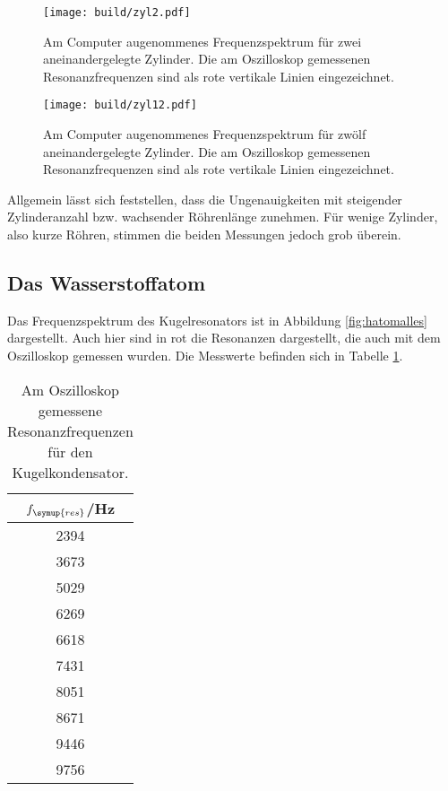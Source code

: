 \begin{figure}
  \centering
  \texttt{[image: build/zyl2.pdf]}
  \caption{Am Computer augenommenes Frequenzspektrum für zwei aneinandergelegte
  Zylinder. Die am Oszilloskop gemessenen Resonanzfrequenzen sind als rote vertikale
  Linien eingezeichnet.}
  \label{fig:zyl2}
\end{figure}
\begin{figure}
  \centering
  \texttt{[image: build/zyl12.pdf]}
  \caption{Am Computer augenommenes Frequenzspektrum für zwölf aneinandergelegte
  Zylinder. Die am Oszilloskop gemessenen Resonanzfrequenzen sind als rote vertikale
  Linien eingezeichnet.}
  \label{fig:zyl12}
\end{figure}


Allgemein lässt sich feststellen, dass die Ungenauigkeiten mit steigender Zylinderanzahl
bzw. wachsender Röhrenlänge zunehmen. Für wenige Zylinder, also kurze Röhren, stimmen
die beiden Messungen jedoch grob überein.

\newpage
\subsection{Das Wasserstoffatom}
\label{subsec:hatom}

Das Frequenzspektrum des Kugelresonators ist in Abbildung \ref{fig:hatomalles} dargestellt.
Auch hier sind in rot die Resonanzen dargestellt, die auch mit dem Oszilloskop
gemessen wurden. Die Messwerte befinden sich in Tabelle \ref{tab:oszires}.

\begin{table}[htp]
	\begin{center}
    \caption{Am Oszilloskop gemessene Resonanzfrequenzen für den Kugelkondensator.}
		\label{tab:oszires}
		\begin{tabular}{c}
		\toprule
			{$f_\symup{res}$/Hz}\\
			\midrule
			2394\\
			3673\\
			5029\\
			6269\\
			6618\\
			7431\\
			8051\\
			8671\\
			9446\\
			9756\\
		\bottomrule
		\end{tabular}
	\end{center}
\end{table}


